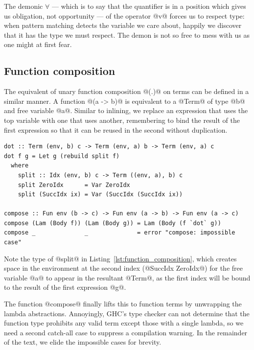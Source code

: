 The demonic $\forall$ --- which is to say that the quantifier is in a position
which gives us obligation, not opportunity --- of the operator @v@ forces
us to respect type: when pattern matching detects the variable we care about,
happily we discover that it has the type we must respect. The demon is not so
free to mess with us as one might at first fear.


\subsection{Function composition}
\label{sec:function_composition}

The equivalent of unary function composition @(.)@ on terms can be
defined in a similar manner. A function @(a -> b)@ is equivalent to a
@Term@ of type @b@ and free variable @a@. Similar to inlining, we
replace an expression that uses the top variable with one that uses another,
remembering to bind the result of the first expression so that it can be reused
in the second without duplication.

\begin{lstlisting}[style=haskell_float
    ,label=lst:function_composition
    ,caption={A simultaneous substitution to compose unary function terms}]
dot :: Term (env, b) c -> Term (env, a) b -> Term (env, a) c
dot f g = Let g (rebuild split f)
  where
    split :: Idx (env, b) c -> Term ((env, a), b) c
    split ZeroIdx      = Var ZeroIdx
    split (SuccIdx ix) = Var (SuccIdx (SuccIdx ix))

compose :: Fun env (b -> c) -> Fun env (a -> b) -> Fun env (a -> c)
compose (Lam (Body f)) (Lam (Body g)) = Lam (Body (f `dot` g))
compose _              _              = error "compose: impossible case"
\end{lstlisting}

Note the type of @split@ in Listing~\ref{lst:function_composition}, which
creates space in the environment at the second index (@SuccIdx ZeroIdx@) for the
free variable @a@ to appear in the resultant @Term@, as the first index will be
bound to the result of the first expression @g@.

The function @compose@ finally lifts this to function terms by unwrapping the
lambda abstractions. Annoyingly, GHC's type checker can not determine that the
function type prohibits any valid term except those with a single lambda, so we
need a second catch-all case to suppress a compilation warning. In the remainder
of the text, we elide the impossible cases for brevity.


